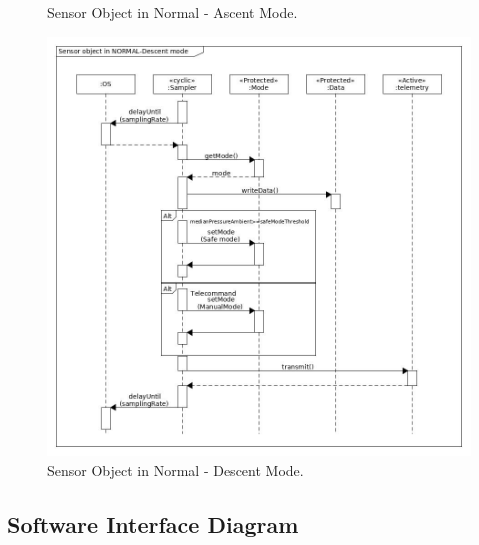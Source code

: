 \documentclass[a4paper,12pt,oneside]{article}
\begin{document}
\begin{appendices}
\begin{landscape}
\begin{figure}[H]
    \caption{Sensor Object in Normal - Ascent Mode.}
    \label{sensorb}
\end{figure}
\begin{figure}[H]
    \centering
    \includegraphics[height=0.9\textwidth]{appendix/img/softwareDiagrams/Sequance-Diagram-descent-Mode.jpg}
    \caption{Sensor Object in Normal - Descent Mode.}
    \label{sensorc}
\end{figure}
\end{landscape}
\newpage
\subsection{Software Interface Diagram} \label{sec:appC}

\end{appendices}
\end{document}
